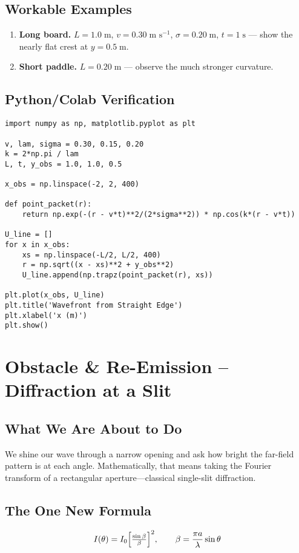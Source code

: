 \documentclass[12pt]{article}
\begin{document}
\subsection*{Workable Examples}
\begin{enumerate}
  \item \textbf{Long board.}  \(L=1.0\;\text{m}\), \(v=0.30\;\text{m s}^{-1}\), \(\sigma=0.20\;\text{m}\), \(t=1\;\text{s}\) — show the nearly flat crest at \(y=0.5\;\text{m}\).
  \item \textbf{Short paddle.}  \(L=0.20\;\text{m}\) — observe the much stronger curvature.
\end{enumerate}

\subsection*{Python/Colab Verification}
\begin{lstlisting}[caption=Line-source superposition,label=lst:line]
import numpy as np, matplotlib.pyplot as plt

v, lam, sigma = 0.30, 0.15, 0.20
k = 2*np.pi / lam
L, t, y_obs = 1.0, 1.0, 0.5

x_obs = np.linspace(-2, 2, 400)

def point_packet(r):
    return np.exp(-(r - v*t)**2/(2*sigma**2)) * np.cos(k*(r - v*t))

U_line = []
for x in x_obs:
    xs = np.linspace(-L/2, L/2, 400)
    r = np.sqrt((x - xs)**2 + y_obs**2)
    U_line.append(np.trapz(point_packet(r), xs))

plt.plot(x_obs, U_line)
plt.title('Wavefront from Straight Edge')
plt.xlabel('x (m)')
plt.show()
\end{lstlisting}

\section{Obstacle \& Re-Emission – Diffraction at a Slit}

\subsection*{What We Are About to Do}
We shine our wave through a narrow opening and ask how bright the far-field pattern is at each angle.  
Mathematically, that means taking the Fourier transform of a rectangular aperture—classical single-slit diffraction.

\subsection*{The One New Formula}
\begin{equation}
I(\theta)=I_{0}\Bigl[\tfrac{\sin\beta}{\beta}\Bigr]^{2},
\qquad
\beta=\frac{\pi a}{\lambda}\sin\theta
\end{equation}
\end{document}
